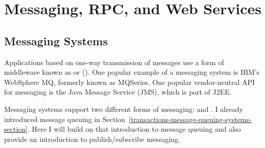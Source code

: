 \chapter{Messaging, RPC, and Web Services}
\label{distmid-chapter}

\section{Messaging Systems}\label{messaging-section}

Applications based on one-way transmission of messages use a form of
middleware known as  or
 ().  One popular
example of a messaging system is IBM's WebSphere MQ, formerly known as
MQSeries.  One popular vendor-neutral API for messaging is the Java
Message Service (JMS), which is part of J2EE.

Messaging systems support two different forms of messaging:
 and .  I
already introduced message queuing in
Section~\ref{transactions-message-queuing-systems-section}.  Here I
will build on that introduction to message queuing and also
provide an introduction to publish/subscribe messaging.

